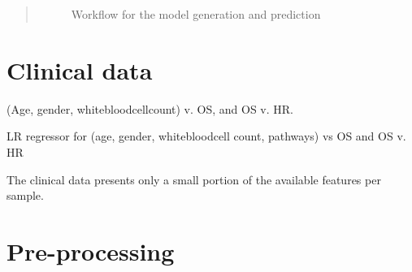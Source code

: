 \documentclass[a4paper,10pt]{article}
\begin{document}
\begin{abstract}
\begin{figure}[htp]
\caption{Workflow for the model generation and prediction}
\label{fig:workflow}
\end{figure}
%
%
\end{abstract}
%
\section{Clinical data}
%
(Age, gender, whitebloodcellcount) v. OS, and OS v. HR. 

LR regressor for (age, gender, whitebloodcell count, pathways) vs OS and OS v. HR

The clinical data presents only a small portion of the available features per sample.

\section{Pre-processing}
\end{document}
